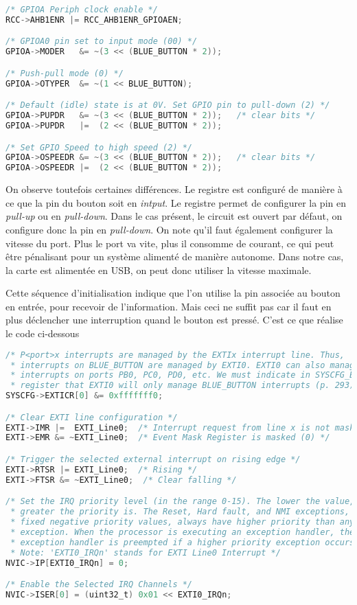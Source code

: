 \documentclass{FicheLecture}
\begin{document}
\begin{lstlisting}[language=C]
/* GPIOA Periph clock enable */
RCC->AHB1ENR |= RCC_AHB1ENR_GPIOAEN;

/* GPIOA0 pin set to input mode (00) */
GPIOA->MODER   &= ~(3 << (BLUE_BUTTON * 2));

/* Push-pull mode (0) */
GPIOA->OTYPER  &= ~(1 << BLUE_BUTTON);

/* Default (idle) state is at 0V. Set GPIO pin to pull-down (2) */
GPIOA->PUPDR   &= ~(3 << (BLUE_BUTTON * 2));   /* clear bits */
GPIOA->PUPDR   |=  (2 << (BLUE_BUTTON * 2));

/* Set GPIO Speed to high speed (2) */
GPIOA->OSPEEDR &= ~(3 << (BLUE_BUTTON * 2));   /* clear bits */
GPIOA->OSPEEDR |=  (2 << (BLUE_BUTTON * 2));
\end{lstlisting}

On observe toutefois certaines différences. Le registre  est configuré de manière à ce que la pin du bouton soit en \emph{intput}. Le registre  permet de configurer la pin en \emph{pull-up} ou en \emph{pull-down}. Dans le cas présent, le circuit est ouvert par défaut, on configure donc la pin en \emph{pull-down}. On note qu'il faut également configurer la vitesse du port. Plus le port va vite, plus il consomme de courant, ce qui peut être pénalisant pour un système alimenté de manière autonome. Dans notre cas, la carte est alimentée en USB, on peut donc utiliser la vitesse maximale.

Cette séquence d'initialisation indique que l'on utilise la pin associée au bouton en entrée, pour recevoir de l'information. Mais ceci ne suffit pas car il faut en plus déclencher une interruption quand le bouton est pressé. C'est ce que réalise le code ci-dessous

\begin{lstlisting}[language=C]
/* P<port>x interrupts are managed by the EXTIx interrupt line. Thus,
 * interrupts on BLUE_BUTTON are managed by EXTI0. EXTI0 can also manage
 * interrupts on ports PB0, PC0, PD0, etc. We must indicate in SYSCFG_EXTICR1
 * register that EXTI0 will only manage BLUE_BUTTON interrupts (p. 293) */
SYSCFG->EXTICR[0] &= 0xfffffff0;

/* Clear EXTI line configuration */
EXTI->IMR |=  EXTI_Line0;  /* Interrupt request from line x is not masked (1) */
EXTI->EMR &= ~EXTI_Line0;  /* Event Mask Register is masked (0) */

/* Trigger the selected external interrupt on rising edge */
EXTI->RTSR |= EXTI_Line0;  /* Rising */
EXTI->FTSR &= ~EXTI_Line0;  /* Clear falling */

/* Set the IRQ priority level (in the range 0-15). The lower the value, the
 * greater the priority is. The Reset, Hard fault, and NMI exceptions, with
 * fixed negative priority values, always have higher priority than any other
 * exception. When the processor is executing an exception handler, the
 * exception handler is preempted if a higher priority exception occurs. 
 * Note: 'EXTI0_IRQn' stands for EXTI Line0 Interrupt */
NVIC->IP[EXTI0_IRQn] = 0;

/* Enable the Selected IRQ Channels */
NVIC->ISER[0] = (uint32_t) 0x01 << EXTI0_IRQn;
\end{lstlisting}
\end{document}
